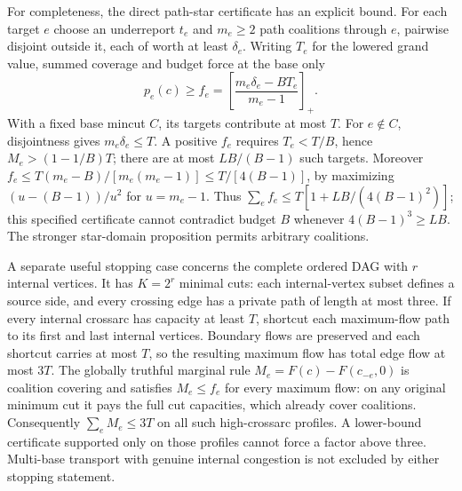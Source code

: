 \documentclass[11pt]{article}
\theoremstyle{definition}\newtheorem{definition}[theorem]{Definition}
\theoremstyle{remark}\newtheorem{remark}[theorem]{Remark}
\begin{document}
For completeness, the direct path-star certificate has an explicit bound.
For each target $e$ choose an underreport $t_e$ and $m_e\ge2$ path coalitions
through $e$, pairwise disjoint outside it, each of worth at least $\delta_e$.
Writing $T_e$ for the lowered grand value, summed coverage and budget force
at the base only
\[
 p_e(c)\ge f_e=\left[\frac{m_e\delta_e-BT_e}{m_e-1}\right]_+.
\]
With a fixed base mincut $C$, its targets contribute at most $T$.
For $e\notin C$, disjointness gives $m_e\delta_e\le T$.
A positive $f_e$ requires $T_e<T/B$, hence $M_e>(1-1/B)T$; there are
at most $LB/(B-1)$ such targets. Moreover
$f_e\le T(m_e-B)/[m_e(m_e-1)]\le T/[4(B-1)]$, by maximizing
$(u-(B-1))/u^2$ for $u=m_e-1$.
Thus $\sum_ef_e\le T[1+LB/(4(B-1)^2)]$; this specified certificate
cannot contradict budget $B$ whenever $4(B-1)^3\ge LB$.
The stronger star-domain proposition permits arbitrary coalitions.

A separate useful stopping case concerns the complete ordered DAG with
$r$ internal vertices. It has $K=2^r$ minimal cuts: each internal-vertex
subset defines a source side, and every crossing edge has a private path
of length at most three. If every internal crossarc has capacity at least
$T$, shortcut each maximum-flow path to its first and last internal
vertices. Boundary flows are preserved and each shortcut carries at most
$T$, so the resulting maximum flow has total edge flow at most $3T$.
The globally truthful marginal rule $M_e=F(c)-F(c_{-e},0)$ is coalition
covering and satisfies $M_e\le f_e$ for every maximum flow: on any original
minimum cut it pays the full cut capacities, which already cover coalitions.
Consequently $\sum_eM_e\le3T$ on all such high-crossarc profiles.
A lower-bound certificate supported only on those profiles cannot force a
factor above three. Multi-base transport with genuine internal congestion
is not excluded by either stopping statement.
\end{document}
